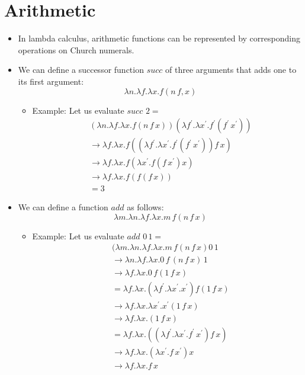 \documentclass[]{article}
\begin{document}
\section{Arithmetic}
\begin{itemize}
\item In lambda calculus, arithmetic functions can be represented by corresponding operations on Church numerals.
\item We can define a successor function $succ$ of three arguments that adds one to its first argument:
\[ \lambda n.\lambda f.\lambda x.f (n\,f,x) \]
\begin{itemize}
\item Example: Let us evaluate $succ\,\,2 = $
\begin{align*}
&(\lambda n.\lambda f.\lambda x.f(n\,f\,x))(\lambda f^\prime.\lambda x^\prime.f^\prime(f^\prime\,x^\prime)) \\
&\rightarrow \lambda f.\lambda x.f((\lambda f^\prime.\lambda x^\prime.f^\prime(f^\prime\,x^\prime))f\,x) \\
&\rightarrow \lambda f.\lambda x.f(\lambda x^\prime.f(f\,x^\prime)x) \\
&\rightarrow \lambda f.\lambda x.f(f(f\,x)) \\
&= 3
\end{align*}
\end{itemize}
\item We can define a function $add$ as follows:
\[ \lambda m.\lambda n.\lambda f.\lambda x.m\,f(n\,f\,x) \]
\begin{itemize}
\item Example: Let us evaluate $add\,\,0\,1=$
\begin{align*}
&(\lambda m.\lambda n.\lambda f.\lambda x.m\,f(n\,f\,x)0\,1 \\
&\rightarrow \lambda n.\lambda f.\lambda x.0\,f\,(n\,f\,x)\,1\\
&\rightarrow \lambda f.\lambda x.0\,f(1\,f\,x) \\
&= \lambda f.\lambda x.(\lambda f^\prime.\lambda x^\prime.x^\prime)f(1\,f\,x)\\
&\rightarrow \lambda f.\lambda x.\lambda x^\prime.x^\prime(1\,f\,x) \\
&\rightarrow \lambda f.\lambda x.(1\,f\,x) \\
&= \lambda f.\lambda x.((\lambda f^\prime.\lambda x^\prime.f^\prime\,x^\prime)f\,x) \\
&\rightarrow \lambda f.\lambda x.(\lambda x^\prime.f\,x^\prime)x\\
&\rightarrow \lambda f.\lambda x.f\,x \\

\end{align*}
\end{itemize}
\end{itemize}
\end{document}
